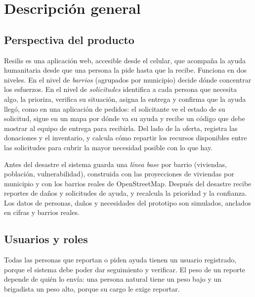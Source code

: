 \section{Descripción general}

\subsection{Perspectiva del producto}
Resilis es una aplicación web, accesible desde el celular, que acompaña la ayuda humanitaria desde que una persona la pide hasta que la recibe. Funciona en dos niveles. En el nivel de \emph{barrios} (agrupados por municipio) decide dónde concentrar los esfuerzos. En el nivel de \emph{solicitudes} identifica a cada persona que necesita algo, la prioriza, verifica su situación, asigna la entrega y confirma que la ayuda llegó, como en una aplicación de pedidos: el solicitante ve el estado de su solicitud, sigue en un mapa por dónde va su ayuda y recibe un código que debe mostrar al equipo de entrega para recibirla. Del lado de la oferta, registra las donaciones y el inventario, y calcula cómo repartir los recursos disponibles entre las solicitudes para cubrir la mayor necesidad posible con lo que hay.

Antes del desastre el sistema guarda una \emph{línea base} por barrio (viviendas, población, vulnerabilidad), construida con las proyecciones de viviendas por municipio y con los barrios reales de OpenStreetMap. Después del desastre recibe reportes de daños y solicitudes de ayuda, y recalcula la prioridad y la confianza. Los datos de personas, daños y necesidades del prototipo son simulados, anclados en cifras y barrios reales.

\subsection{Usuarios y roles}
Todas las personas que reportan o piden ayuda tienen un usuario registrado, porque el sistema debe poder dar seguimiento y verificar. El peso de un reporte depende de quién lo envía: una persona natural tiene un peso bajo y un brigadista un peso alto, porque su cargo le exige reportar.

